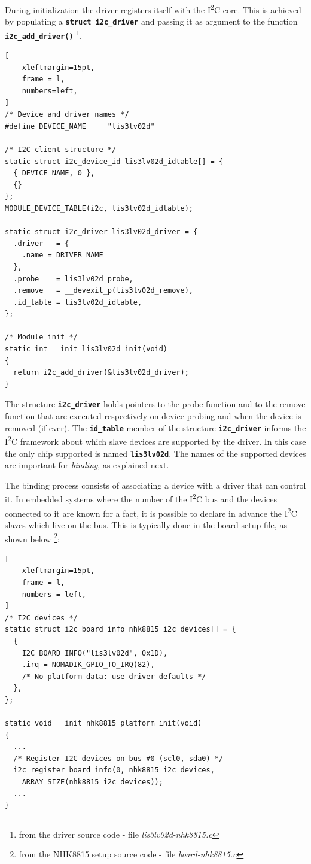 \documentclass[a4paper,10pt]{article}
\newcommand{\icc}{I\textsuperscript{2}C }
\newcommand{\keyword}[1]{\texttt{\textbf{#1}}}
\begin{document}
\begin{multicols}{2}
During initialization the driver registers itself with the \icc core. This
is achieved by populating a \keyword{struct i2c\_driver} and passing it
as argument to the function \keyword{i2c\_add\_driver()}
\footnote{from the driver source code - file \emph{lis3lv02d-nhk8815.c}}.

\begin{lstlisting}[
	xleftmargin=15pt,
	frame = l,
	numbers=left,
]
/* Device and driver names */
#define	DEVICE_NAME		"lis3lv02d"

/* I2C client structure */
static struct i2c_device_id lis3lv02d_idtable[] = {
  { DEVICE_NAME, 0 },
  {}
};
MODULE_DEVICE_TABLE(i2c, lis3lv02d_idtable);

static struct i2c_driver lis3lv02d_driver = {
  .driver   = {
    .name = DRIVER_NAME
  },
  .probe    = lis3lv02d_probe,
  .remove   = __devexit_p(lis3lv02d_remove),
  .id_table = lis3lv02d_idtable,
};

/* Module init */
static int __init lis3lv02d_init(void)
{
  return i2c_add_driver(&lis3lv02d_driver);
}
\end{lstlisting}

The structure \keyword{i2c\_driver} holds pointers to the probe function
and to the remove function that are executed respectively on device probing
and when the device is removed (if ever).
The \keyword{id\_table} member of the structure \keyword{i2c\_driver} informs
the \icc framework about which slave devices are supported by the driver.
In this case the only chip supported is named \keyword{lis3lv02d}.
The names of the supported devices are important for \emph{binding}, as
explained next.

The binding process consists of associating a device with a driver that can
control it. In embedded systems where the number of the \icc bus and the
devices connected to it are known for a fact, it is possible to declare in
advance the \icc slaves which live on the bus. This is typically done in the
board setup file, as shown below
\footnote{from the NHK8815 setup source code - file \emph{board-nhk8815.c}}:

\begin{lstlisting}[
	xleftmargin=15pt,
	frame = l,
	numbers = left,
]
/* I2C devices */
static struct i2c_board_info nhk8815_i2c_devices[] = {
  {
    I2C_BOARD_INFO("lis3lv02d", 0x1D),
    .irq = NOMADIK_GPIO_TO_IRQ(82),
    /* No platform data: use driver defaults */
  },
};

static void __init nhk8815_platform_init(void)
{
  ...
  /* Register I2C devices on bus #0 (scl0, sda0) */
  i2c_register_board_info(0, nhk8815_i2c_devices,
    ARRAY_SIZE(nhk8815_i2c_devices));
  ...
}
\end{lstlisting}


\end{multicols}
\end{document}
